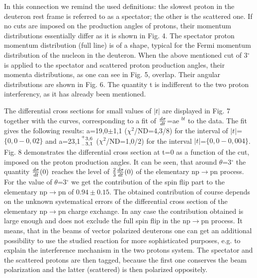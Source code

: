 \documentclass[a4paper,12pt]{article}
\begin{document}
    In this connection we remind the used definitions: the slowest proton
    in the deuteron rest frame
    is referred to as a spectator; the other is the scattered one. If
    no cuts are imposed on the production angles of protons, their momentum
    distributions essentially differ as it is shown in Fig. 4. The spectator
    proton momentum distribution (full line) is of a shape, typical for the Fermi
    momentum distribution of the nucleon in the deuteron. When the above
    mentioned cut of 3$^\circ$ is applied to the spectator and scattered
    proton production angles, their momenta distributions, as one can see in Fig. 5,
    overlap. Their angular distributions are shown in Fig. 6.
    The quantity t is indifferent to the two proton
    interferency, as it has already been mentioned.

    The differential cross sections for small values of $\vert t\vert$ are
    displayed in Fig. 7 together with the curves, corresponding to a fit
    of ${d\sigma\over dt}$=ae $^{bt}$ to the data. The fit gives the
    following results: a=19,0$\pm$1,1
    ($\chi^2$/ND=4,3/8) for the interval of
    $\vert t\vert$=$\lbrace 0,0-0,02\rbrace$
    and  a=23,1${^+3,6 \atop _ -3,1}$
    ($\chi^2$/ND=1,0/2)
    for the interval
    $\vert t\vert$=$\lbrace 0,0-0,004 \rbrace$. Fig. 8 demonstrates
    the differential cross section at t=0 as a function of the cut, imposed
    on the proton production angles. It can be seen, that around $\theta$=3$^\circ$
    the quantity ${d\sigma\over dt}(0)$ reaches the level of
    ${2\over3}{d\sigma\over dt}(0)$ of the elementary np$\to$pn process.
    For the value of $\theta$=3$^\circ$ we get the contribution of the spin
    flip part to the elementary np$\to$pn of $0.94 \pm 0.15$. The obtained
    contribution of course depends on the unknown  systematical errors of the
    differential cross section of the elementary np$\to$pn charge exchange.
    In any case the contribution obtained is large enough and does not exclude
    the full spin flip in the np$\to$pn process. It means, that in the beams
    of vector  polarized deuterons one can get an additional possibility
    to use the studied reaction for more sophisticated purposes, e.g. to
    explain the interference mechanism in the two protons system. The
    spectator and the scattered protons are then tagged, because the first
    one conserves the beam polarization and the latter (scattered) is then
    polarized oppositely.
\end{document}
